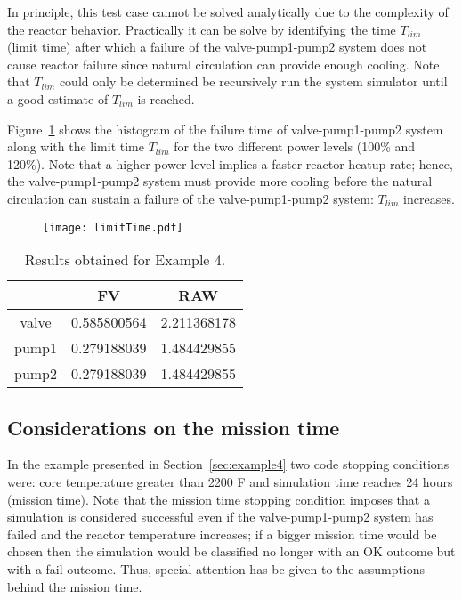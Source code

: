 In principle, this test case cannot be solved analytically due to the complexity of the reactor 
behavior. Practically it can be solve by identifying the time $T_{lim}$ (limit time) after which a 
failure of the valve-pump1-pump2 system does not cause reactor failure since natural circulation
can provide enough cooling.
Note that $T_{lim}$ could only be determined be recursively run the system simulator until a 
good estimate of $T_{lim}$ is reached.

Figure~\ref{fig:limitTime} shows the histogram of the failure time of valve-pump1-pump2 system along 
with the limit time $T_{lim}$ for the two different power levels (100\% and 120\%). 
Note that a higher power level implies a faster reactor heatup rate; hence, the 
valve-pump1-pump2 system must provide more cooling before the natural circulation can sustain a failure
of the valve-pump1-pump2 system: $T_{lim}$ increases.

\begin{figure}
    \centering
    \centerline{\texttt{[image: limitTime.pdf]}}
    \caption{}
    \label{fig:limitTime}
\end{figure}

\begin{table}
  \caption{Results obtained for Example 4.}
  \centering
  \begin{tabular}{c | c | c }
    \hline
          & FV & RAW \\
    \hline
    valve & 0.585800564 & 2.211368178  \\
    pump1 & 0.279188039 & 1.484429855  \\
    pump2 & 0.279188039 & 1.484429855  \\
    \hline
  \end{tabular}
  \label{tab:example4}
\end{table}

\subsection{Considerations on the mission time}
\label{sec:missionTime}

In the example presented in Section~\ref{sec:example4} two code stopping conditions were: core temperature 
greater than 2200 F and simulation time reaches 24 hours (mission time).
Note that the mission time stopping condition imposes that a simulation is considered successful even if the
valve-pump1-pump2 system has failed and the reactor temperature increases; if a bigger mission time would 
be chosen then the simulation would be classified no longer with an OK outcome but with a fail outcome.
Thus, special attention has be given to the assumptions behind the mission time. 

